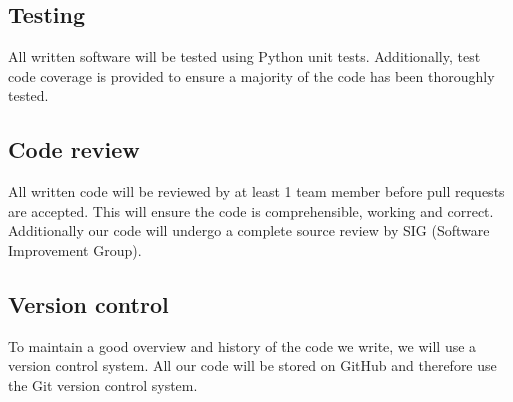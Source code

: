 \subsection{Testing}
All written software will be tested using Python unit tests. Additionally, test code coverage is provided to ensure a majority of the code has been thoroughly tested.

\subsection{Code review}
All written code will be reviewed by at least 1 team member before pull requests are accepted. This will ensure the code is comprehensible, working and correct. Additionally our code will undergo a complete source review by SIG (Software Improvement Group).

\subsection{Version control}
To maintain a good overview and history of the code we write, we will use a version control system. All our code will be stored on GitHub and therefore use the Git version control system.

